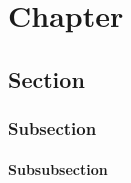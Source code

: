\documentclass[cdfont=off,cd=pale]{tudscrreprt}
\begin{document}

\begingroup
{}
\tableofcontents
\endgroup

\chapter{Chapter}
\lipsum
\section{Section}
\lipsum
\subsection{Subsection}
\lipsum
\subsubsection{Subsubsection}
\lipsum
\end{document}
